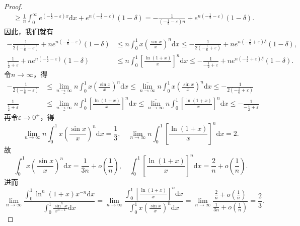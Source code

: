 \documentclass[../../main.tex]{subfiles}
\begin{document}
\begin{proof}
\begin{align*}
&\geqslant \frac{1}{n}\int_0^{\infty}{e^{\left( -\frac{1}{2}-\varepsilon \right) x}\mathrm{d}x}+e^{n\left( -\frac{1}{2}-\varepsilon \right)}\left( 1-\delta \right) =-\frac{1}{\left( -\frac{1}{2}-\varepsilon \right) n}+e^{n\left( -\frac{1}{2}-\varepsilon \right)}\left( 1-\delta \right) .
\end{align*}
因此，我们就有
\begin{align*}
-\frac{1}{2\left( -\frac{1}{6}-\varepsilon \right)}+ne^{n\left( -\frac{1}{6}-\varepsilon \right)}\left( 1-\delta \right) &\leqslant n\int_0^1{x\left( \frac{\sin x}{x} \right) ^n\mathrm{d}x}\leqslant -\frac{1}{2\left( -\frac{1}{6}+\varepsilon \right)}+ne^{n\left( -\frac{1}{6}+\varepsilon \right) \delta}\left( 1-\delta \right) ,\\
\frac{1}{\frac{1}{2}+\varepsilon}+ne^{n\left( -\frac{1}{2}-\varepsilon \right)}\left( 1-\delta \right) &\leqslant n\int_0^1{\left[ \frac{\ln \left( 1+x \right)}{x} \right] ^n\mathrm{d}x}\leqslant -\frac{1}{-\frac{1}{2}+\varepsilon}+ne^{n\left( -\frac{1}{2}+\varepsilon \right) \delta}\left( 1-\delta \right) .
\end{align*}
令$n\rightarrow \infty$，得
\begin{align*}
-\frac{1}{2\left( -\frac{1}{6}-\varepsilon \right)}&\leqslant \underline{\lim\limits_{n\rightarrow \infty}}n\int_0^1{x\left( \frac{\sin x}{x} \right) ^n\mathrm{d}x}\leqslant \overline{\lim\limits_{n\rightarrow \infty}}n\int_0^1{x\left( \frac{\sin x}{x} \right) ^n\mathrm{d}x}\leqslant -\frac{1}{2\left( -\frac{1}{6}+\varepsilon \right)}\\
\frac{1}{\frac{1}{2}+\varepsilon}&\leqslant \underline{\lim\limits_{n\rightarrow \infty}}n\int_0^1{\left[ \frac{\ln \left( 1+x \right)}{x} \right] ^n\mathrm{d}x}\leqslant \overline{\lim\limits_{n\rightarrow \infty}}n\int_0^1{\left[ \frac{\ln \left( 1+x \right)}{x} \right] ^n\mathrm{d}x}\leqslant -\frac{1}{-\frac{1}{2}+\varepsilon}
\end{align*}
再令$\varepsilon \rightarrow 0^+$，得
\[
\lim\limits_{n\rightarrow \infty}n\int_0^1{x\left( \frac{\sin x}{x} \right) ^n\mathrm{d}x}=\frac{1}{3},\quad \lim\limits_{n\rightarrow \infty}n\int_0^1{\left[ \frac{\ln \left( 1+x \right)}{x} \right] ^n\mathrm{d}x}=2.
\]
故
\[
\int_0^1{x\left( \frac{\sin x}{x} \right) ^n\mathrm{d}x}=\frac{1}{3n}+o\left( \frac{1}{n} \right) ,\quad \int_0^1{\left[ \frac{\ln \left( 1+x \right)}{x} \right] ^n\mathrm{d}x}=\frac{2}{n}+o\left( \frac{1}{n} \right) .
\]
进而
\[
\lim\limits_{n\rightarrow \infty}\frac{\int_0^1{\ln ^n(1 + x)x^{-n}\mathrm{d}x}}{\int_0^1{\frac{\sin ^nx}{x^{n-1}}\mathrm{d}x}}=\lim\limits_{n\rightarrow \infty}\frac{\int_0^1{\left[ \frac{\ln \left( 1+x \right)}{x} \right] ^n\mathrm{d}x}}{\int_0^1{x\left( \frac{\sin x}{x} \right) ^n\mathrm{d}x}}=\lim\limits_{n\rightarrow \infty}\frac{\frac{2}{n}+o\left( \frac{1}{n} \right)}{\frac{1}{3n}+o\left( \frac{1}{n} \right)}=\frac{2}{3}.
\]
\end{proof}
\end{document}
